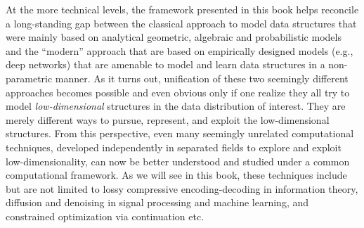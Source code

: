 \documentclass[../../book-main.tex]{subfiles}
\begin{document}
At the more technical levels, the framework presented in this book helps reconcile a long-standing gap between the classical approach to model data structures that were mainly based on analytical geometric, algebraic and probabilistic models and the ``modern'' approach that are based on empirically designed models (e.g., deep networks) that are amenable to model and learn data structures in a non-parametric manner. As it turns out, unification of these two seemingly different approaches becomes possible and even obvious only if one realize they all try to model {\em low-dimensional} structures in the data distribution of interest. They are merely different ways to pursue, represent, and exploit the low-dimensional structures. From this perspective, even many seemingly unrelated computational techniques, developed independently in separated fields to explore and exploit low-dimensionality, can now be better understood and studied under a common computational framework. As we will see in this book, these techniques include but are not limited to lossy compressive encoding-decoding in information theory, diffusion and denoising in signal processing and machine learning, and constrained optimization via continuation etc. 
\end{document}
